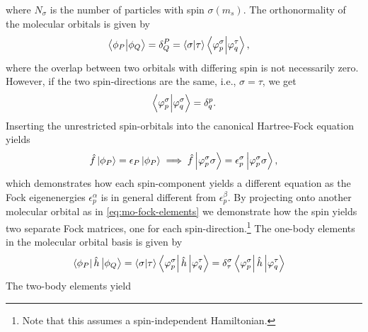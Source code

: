             where $N_{\sigma}$ is the number of particles with spin
            $\sigma(m_s)$.
            The orthonormality of the molecular orbitals is given by
            \begin{align}
                \braket{\phi_P}{\phi_Q}
                &= \delta^{P}_{Q}
                = \braket{\sigma}{\tau}
                \braket{\varphi^{\sigma}_{p}}{\varphi^{\tau}_{q}},
            \end{align}
            where the overlap between two orbitals with differing spin is not
            necessarily zero.
            However, if the two spin-directions are the same, i.e., $\sigma =
            \tau$, we get
            \begin{align}
                \braket{\varphi^{\sigma}_{p}}{\varphi^{\sigma}_{q}}
                = \delta^{p}_{q}.
            \end{align}
            Inserting the unrestricted spin-orbitals into the canonical
            Hartree-Fock equation yields
            \begin{align}
                \hat{f}\ket{\phi_P}
                = \epsilon_P\ket{\phi_P}
                \implies
                \hat{f}\ket{\varphi^{\sigma}_{p}\sigma}
                = \epsilon^{\sigma}_{p}\ket{\varphi^{\sigma}_{p} \sigma},
            \end{align}
            which demonstrates how each spin-component yields a different
            equation as the Fock eigenenergies $\epsilon^{\alpha}_{p}$ is in
            general different from $\epsilon^{\beta}_{p}$.
            By projecting onto another molecular orbital as in
            \autoref{eq:mo-fock-elements} we demonstrate how the spin yields two
            separate Fock matrices, one for each spin-direction.\footnote{%
                Note that this assumes a spin-independent Hamiltonian.
            }
            The one-body elements in the molecular orbital basis is given by
            \begin{align}
                \bra{\phi_P}\hat{h}\ket{\phi_Q}
                &= \braket{\sigma}{\tau}
                \bra{\varphi^{\sigma}_{p}}
                \hat{h}
                \ket{\varphi^{\tau}_{q}}
                = \delta^{\sigma}_{\tau}
                \bra{\varphi^{\sigma}_{p}}
                \hat{h}
                \ket{\varphi^{\tau}_{q}}
            \end{align}
            The two-body elements yield
